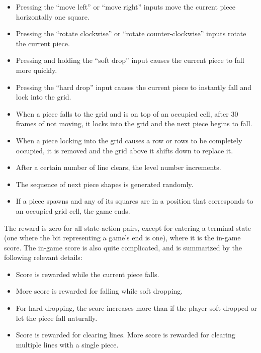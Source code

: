 \documentclass[letterpaper]{article} %
\begin{document}
\begin{itemize}
  \item{
        Pressing the ``move left'' or ``move right'' inputs move the current piece horizontally one square.
        }
  \item{
        Pressing the ``rotate clockwise'' or ``rotate counter-clockwise'' inputs rotate the current piece.
        }
  \item{
        Pressing and holding the ``soft drop'' input causes the current piece to fall more quickly.
        }
  \item{
        Pressing the ``hard drop'' input causes the current piece to instantly fall and lock into the grid.
        }
  \item{
        When a piece falls to the grid and is on top of an occupied cell, after 30 frames of not moving, it locks into the grid and the next piece begins to fall.
        }
  \item{
        When a piece locking into the grid causes a row or rows to be completely occupied, it is removed and the grid above it shifts down to replace it.
        }
  \item{
        After a certain number of line clears, the level number increments.
        }
  \item{
        The sequence of next piece shapes is generated randomly.
        }
  \item{
        If a piece spawns and any of its squares are in a position that corresponds to an occupied grid cell, the game ends.
        }
\end{itemize}

The reward is zero for all state-action pairs, except for entering a terminal state (one where the bit representing a game's end is one), where it is the in-game score. The in-game score is also quite complicated, and is summarized by the following relevant details:

\begin{itemize}
  \item{
        Score is rewarded while the current piece falls.
        }
  \item{
        More score is rewarded for falling while soft dropping.
        }
  \item{
        For hard dropping, the score increases more than if the player soft dropped or let the piece fall naturally.
        }
  \item{
        Score is rewarded for clearing lines. More score is rewarded for clearing multiple lines with a single piece.
        }
\end{itemize}
\end{document}
